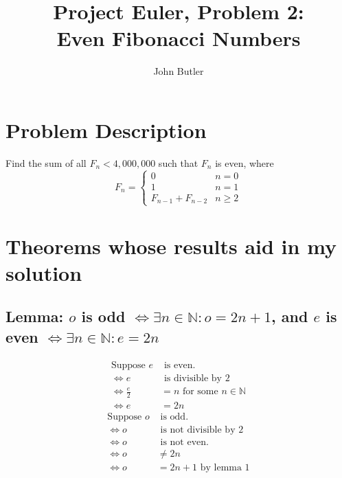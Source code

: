 \documentclass[11pt, oneside]{article}   	%
\title{Project Euler, Problem 2:\\\large{Even Fibonacci Numbers}}
\author{John Butler}
\date{}							%
\begin{document}
\maketitle

\tableofcontents
{}

\section{Problem Description}
	Find the sum of all $F_n < 4,000,000$ such that $F_n$ is even, where
	\[ F_n  = \begin{cases}
		0 & n = 0 \\
		1 & n = 1 \\
		F_{n-1} + F_{n-2} & n \ge 2
	\end{cases}	\]

\section{Theorems whose results aid in my solution}
	
	\subsection{Lemma: $o$ is odd $\iff \exists n \in \mathbb{N} : o =2n + 1$, and $e$ is even $\iff \exists n \in \mathbb{N} : e = 2n$}
		\begin{align*}
			\text{Suppose } e & \text{ is even.}\\
			\iff e & \text{ is divisible by } 2\\
			\iff \frac{e}{2} &= n \text{ for some } n \in \mathbb{N}\\
			\iff e &= 2n
		\end{align*}
		\begin{align*}
			\text{Suppose } o & \text{ is odd.}\\
			\iff o & \text{ is not divisible by } 2\\
			\iff o& \text{ is not even.}\\
			\iff o &\ne 2n\\
			\iff o &= 2n + 1 \text{ by lemma 1}
		\end{align*}

\end{document}
